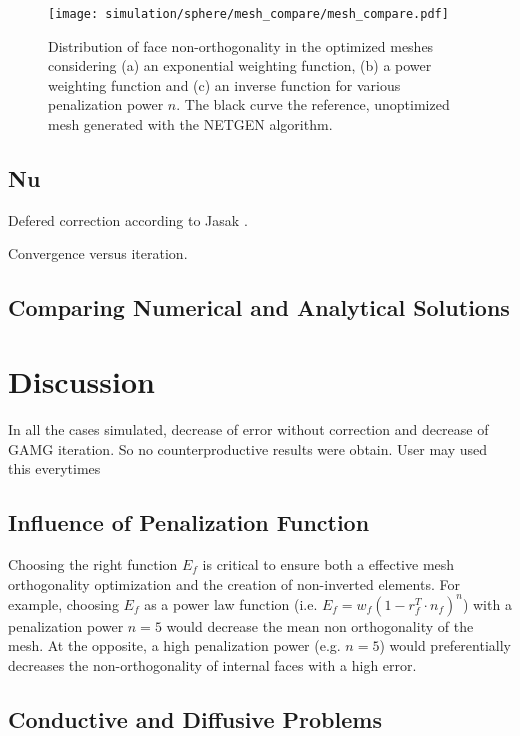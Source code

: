 \documentclass[11pt]{article}
\begin{document}
\begin{figure}[h!]
  \centering
  \texttt{[image: simulation/sphere/mesh\_compare/mesh\_compare.pdf]}
  \label{orthogonality_distribution}
  \caption{Distribution of face non-orthogonality in the optimized meshes considering (a) an exponential weighting function, (b) a power weighting function and (c) an inverse function for various penalization power $n$. The black curve the reference, unoptimized mesh generated with the NETGEN algorithm.}
\end{figure}



\subsection{Nu}

Defered correction according to Jasak \cite{}.

Convergence versus iteration.


\subsection{Comparing Numerical and Analytical Solutions}






\section{Discussion}

In all the cases simulated, decrease of error without correction and decrease of GAMG iteration. 
So no counterproductive results were obtain.
User may used this everytimes

\subsection{Influence of Penalization Function}

Choosing the right function $E_f$ is critical to ensure both a effective mesh orthogonality optimization and the creation of non-inverted elements. 
For example, choosing $E_f$ as a power law function (i.e. $E_f=w_f (1-r_f^T\cdot n_f)^n$) with a penalization power $n=5$ would decrease the mean non orthogonality of the mesh.
At the opposite, a high penalization power (e.g. $n=5$) would preferentially decreases the non-orthogonality of internal faces with a high error.


\subsection{Conductive and Diffusive Problems}
\end{document}
